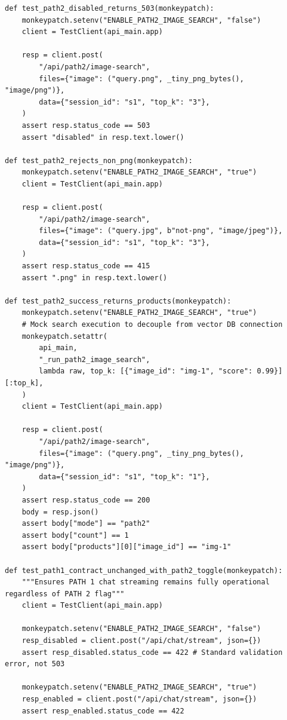 \begin{lstlisting}[caption={PATH 2 Test Suite --- tests/test\_path2\_image\_search.py}]
def test_path2_disabled_returns_503(monkeypatch):
    monkeypatch.setenv("ENABLE_PATH2_IMAGE_SEARCH", "false")
    client = TestClient(api_main.app)

    resp = client.post(
        "/api/path2/image-search",
        files={"image": ("query.png", _tiny_png_bytes(), "image/png")},
        data={"session_id": "s1", "top_k": "3"},
    )
    assert resp.status_code == 503
    assert "disabled" in resp.text.lower()

def test_path2_rejects_non_png(monkeypatch):
    monkeypatch.setenv("ENABLE_PATH2_IMAGE_SEARCH", "true")
    client = TestClient(api_main.app)

    resp = client.post(
        "/api/path2/image-search",
        files={"image": ("query.jpg", b"not-png", "image/jpeg")},
        data={"session_id": "s1", "top_k": "3"},
    )
    assert resp.status_code == 415
    assert ".png" in resp.text.lower()

def test_path2_success_returns_products(monkeypatch):
    monkeypatch.setenv("ENABLE_PATH2_IMAGE_SEARCH", "true")
    # Mock search execution to decouple from vector DB connection
    monkeypatch.setattr(
        api_main,
        "_run_path2_image_search",
        lambda raw, top_k: [{"image_id": "img-1", "score": 0.99}][:top_k],
    )
    client = TestClient(api_main.app)

    resp = client.post(
        "/api/path2/image-search",
        files={"image": ("query.png", _tiny_png_bytes(), "image/png")},
        data={"session_id": "s1", "top_k": "1"},
    )
    assert resp.status_code == 200
    body = resp.json()
    assert body["mode"] == "path2"
    assert body["count"] == 1
    assert body["products"][0]["image_id"] == "img-1"

def test_path1_contract_unchanged_with_path2_toggle(monkeypatch):
    """Ensures PATH 1 chat streaming remains fully operational regardless of PATH 2 flag"""
    client = TestClient(api_main.app)

    monkeypatch.setenv("ENABLE_PATH2_IMAGE_SEARCH", "false")
    resp_disabled = client.post("/api/chat/stream", json={})
    assert resp_disabled.status_code == 422 # Standard validation error, not 503

    monkeypatch.setenv("ENABLE_PATH2_IMAGE_SEARCH", "true")
    resp_enabled = client.post("/api/chat/stream", json={})
    assert resp_enabled.status_code == 422
\end{lstlisting}


